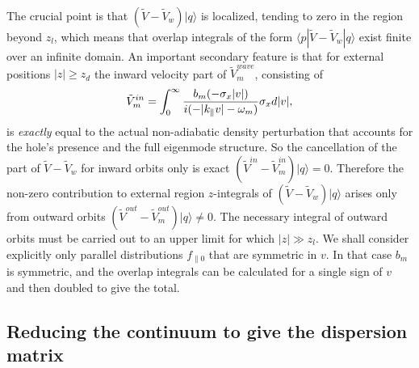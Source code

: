 \documentclass[12pt]{article}
\def\ket#1{|#1\rangle}
\def\bra#1{\langle#1}
\begin{document}
The crucial point is that $(\tilde{V}-\tilde{V}_{w})\ket{q}$ is
localized, tending to zero in the region beyond $z_l$, which means
that overlap integrals of the form
$\bra{p}|\tilde{V}-\tilde{V}_{w}\ket{q}$ exist finite over an infinite
domain. An important secondary feature is that for external positions
$|z|\ge z_d$ the inward velocity part of $\tilde V_m^{wave}$,
consisting of
\begin{equation}
  \label{inward}
  \tilde V_m^{in}= \int_{0}^\infty { b_m(-\sigma_x|v|) \over
    i(-|k_\parallel v|-\omega_m)}\sigma_x d|v|,
\end{equation}
is \emph{exactly} equal to the actual non-adiabatic density
perturbation that accounts for the hole's presence and the full
eigenmode structure. So the cancellation of the part of
$\tilde V-\tilde V_w$ for inward orbits only is exact
$(\tilde V^{in}-\tilde V_m^{in})\ket{q}=0$. Therefore the non-zero
contribution to external region $z$-integrals of
$(\tilde V-\tilde V_w)\ket{q}$ arises only from outward orbits
$(\tilde V^{out}-\tilde V_m^{out})\ket{q}\not=0$. The necessary
integral of outward orbits must be carried out to an upper limit for
which $|z|\gg z_l$. We shall consider explicitly only parallel
distributions $f_{\parallel0}$ that are symmetric in $v$. In that case
$b_m$ is symmetric, and the overlap integrals can be calculated for a
single sign of $v$ and then doubled to give the total.


\subsection{Reducing the continuum to give the dispersion matrix}
\end{document}
